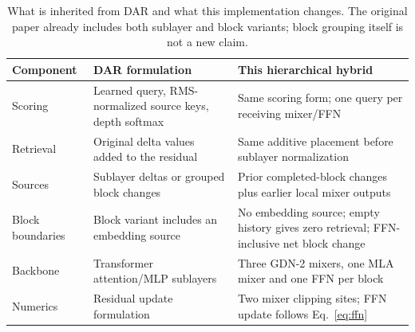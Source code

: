 \documentclass[10pt,a4paper]{article}
\begin{document}
\begin{table}[H]\centering\small
\caption{What is inherited from DAR and what this implementation changes. The original
paper already includes both sublayer and block variants; block grouping itself is not a new claim.}
\label{tab:dar-adaptation}
\begin{tabular}{>{\raggedright\arraybackslash}p{}>{\raggedright\arraybackslash}p{}>{\raggedright\arraybackslash}p{}}\toprule
Component&DAR formulation~\cite{dar}&This hierarchical hybrid\\\midrule
Scoring&Learned query, RMS-normalized source keys, depth softmax&Same scoring form; one query per receiving mixer/FFN\\
Retrieval&Original delta values added to the residual&Same additive placement before sublayer normalization\\
Sources&Sublayer deltas or grouped block changes&Prior completed-block changes plus earlier local mixer outputs\\
Block boundaries&Block variant includes an embedding source&No embedding source; empty history gives zero retrieval; FFN-inclusive net block change\\
Backbone&Transformer attention/MLP sublayers&Three GDN-2 mixers, one MLA mixer and one FFN per block\\
Numerics&Residual update formulation&Two mixer clipping sites; FFN update follows Eq.~\ref{eq:ffn}\\\bottomrule
\end{tabular}\end{table}
\end{document}
